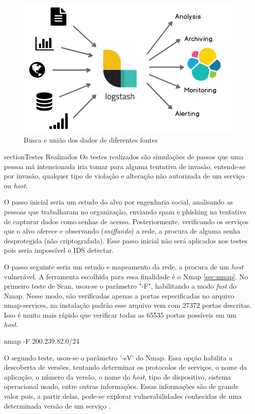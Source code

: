 \documentclass[
	12pt,				
	openright,		
	twoside,	
	a4paper,
	english,	
	brazil	
	]{abntex2}
\begin{document}
\begin{figure}[!htp]
 \centering
 \includegraphics[scale=.4]{logstach.png}
 \caption{Busca e união dos dados de diferentes fontes}
 \label{fig:logstach}
\end{figure}
section{Testes Realizados} \label{sec:testes}
Os testes realizados são simulações de passos que uma pessoa má intencionada iria tomar para alguma tentativa de invasão, entende-se por invasão, qualquer tipo de violação e alteração não autorizada de um serviço ou \textit{host}.

O passo inicial seria um estudo do alvo por engenharia social, analisando as pessoas que trabalharam no organização, enviando spam e phishing na tentativa de capturar dados como senhas de acesso. Posteriormente, verificando os serviços que o alvo oferece e observando (\textit{sniffando}) a rede, a procura de alguma senha desprotegida (não criptografada). Esse passo inicial não será aplicados nos testes pois seria impossível o IDS detectar.

O passo seguinte seria um estudo e mapeamento da rede, a procura de um \textit{host} vulnerável. A ferramenta escolhida para essa finalidade é o Nmap \ref{sec:nmap}. No primeiro teste de Scan, usou-se o parâmetro "-F", habilitando a modo \textit{fast} do Nmap. Nesse modo, são verificadas apenas a portas especificadas no arquivo nmap-services, na instalação padrão esse arquivo vem com 27372 portas descritas. Isso é muito mais rápido que verificar todas as 65535 portas possíveis em um \textit{host}.

nmap -F 200.239.82.0/24

O segundo teste, usou-se o parâmetro '-sV' do Nmap. Essa opção habilita a descoberta de versões, tentando determinar os protocolos de serviços, o nome da aplicação, o número da versão, o nome do \textit{host}, tipo de dispositivo, sistema operacional usado, entre outras informações. Essas informações são de grande valor pois, a partir delas, pode-se explorar vulnerabilidades conhecidas de uma determinada versão de um serviço \cite{nmap}.
\end{document}
